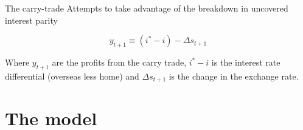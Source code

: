 \documentclass[14pt,xcolor=pdftex,dvipsnames,table]{beamer}
\begin{document}
\begin{frame}{The carry-trade}
Attempts to take advantage of the breakdown in uncovered interest parity
\begin{block}{}
\begin{equation}\label{eqref:carry}
y_{t+1} \equiv (i^* - i) -\Delta s_{t+1}
\end{equation}
\pause
\end{block}
Where $y_{t+1}$ are the profits from the carry trade, $i^* - i$ is the interest rate differential (overseas less home) and $\Delta s_{t+1}$ is the change in the exchange rate.    
\end{frame}


\section{The model}
\end{document}
